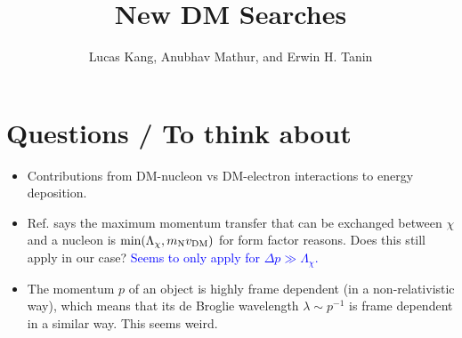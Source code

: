 \documentclass[%
 reprint,
 amsmath,amssymb,
 aps,nofootinbib
]{revtex4-1}
\begin{document}
\title{New DM Searches}
\author{Lucas Kang, Anubhav Mathur, and Erwin H. Tanin}


\maketitle


\tableofcontents


\section{Questions / To think about}
\begin{itemize}
\item Contributions from DM-nucleon vs DM-electron interactions to energy deposition.
\item Ref. \cite{Grabowska:2018lnd} says the maximum momentum transfer that can be exchanged between $\chi$ and a nucleon is $\text{min}(\Lambda_\chi,m_{\rm N}v_{\rm DM})$ for form factor reasons. Does this still apply in our case? \textcolor{blue}{Seems to only apply for $\Delta p\gg \Lambda_\chi$.}
\item The momentum $p$ of an object is highly frame dependent (in a non-relativistic way), which means that its de Broglie wavelength $\lambda\sim p^{-1}$ is frame dependent in a similar way. This seems weird.
\end{itemize}
 
 
\end{document}
